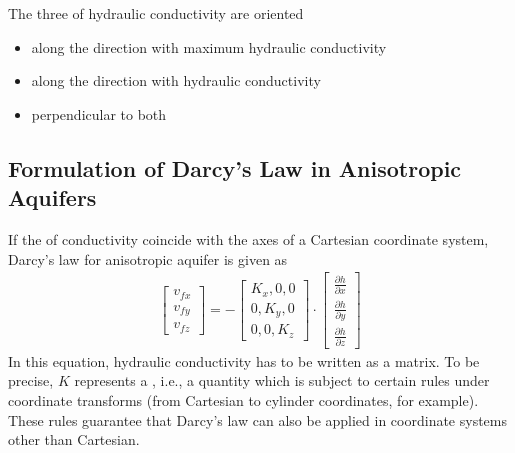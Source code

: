 \documentclass[letterpaper,10pt,english]{jupyterBook}
\begin{document}
\sphinxAtStartPar
The three  of hydraulic conductivity are oriented
\begin{itemize}
\item {} 
\sphinxAtStartPar
along the direction with maximum hydraulic conductivity

\item {} 
\sphinxAtStartPar
along the direction with hydraulic conductivity

\item {} 
\sphinxAtStartPar
perpendicular to both

\end{itemize}


\subsection{Formulation of Darcy’s Law in Anisotropic Aquifers}
\label{\detokenize{content/flow/L6/16_darcy_law_3D:formulation-of-darcy-s-law-in-anisotropic-aquifers}}
\sphinxAtStartPar
If the  of conductivity coincide with the axes of a Cartesian coordinate system, Darcy’s law for anisotropic aquifer is given as
\begin{equation*}
\begin{split}
\begin{bmatrix}
v_{fx}\\ v_{fy}\\ v_{fz}
\end{bmatrix}
= -\begin{bmatrix}
K_x, 0,  0 \\
0, K_y, 0\\
0, 0, K_z
\end{bmatrix}
\cdot
\begin{bmatrix}
\frac{\partial h}{\partial x}\\ \frac{\partial h}{\partial y} \\ \frac{\partial h}{\partial z}
\end{bmatrix}
\end{split}
\end{equation*}
\sphinxAtStartPar
In this equation, hydraulic conductivity has to be written as a matrix. To be precise, \(K\) represents a , i.e., a quantity which is subject to certain rules under coordinate transforms (from Cartesian to cylinder coordinates, for example). These rules guarantee that Darcy’s law can also be applied in coordinate systems other than Cartesian.
\end{document}
